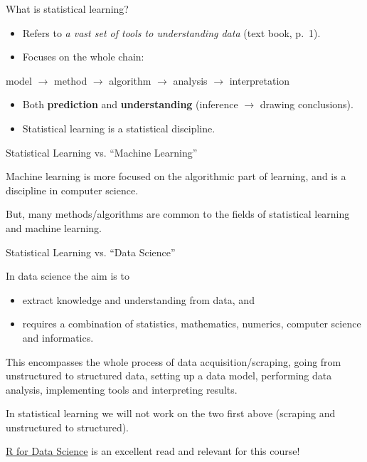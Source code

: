 \documentclass[ignorenonframetext,]{beamer}
\providecommand{\tightlist}{%
  \setlength{\itemsep}{0pt}\setlength{\parskip}{0pt}}
\begin{document}
\begin{frame}{What is statistical learning?}

\begin{itemize}
\item
  Refers to \emph{a vast set of tools to understanding data} (text book,
  p.~1).
\item
  Focuses on the whole chain:
\end{itemize}

model \(\rightarrow\) method \(\rightarrow\) algorithm \(\rightarrow\)
analysis \(\rightarrow\) interpretation

\begin{itemize}
\item
  Both \textbf{prediction} and \textbf{understanding} (inference
  \(\rightarrow\) drawing conclusions).
\item
  Statistical learning is a statistical discipline.
\end{itemize}

\end{frame}

\begin{frame}{Statistical Learning vs. ``Machine Learning''}

Machine learning is more focused on the algorithmic part of learning,
and is a discipline in computer science.

But, many methods/algorithms are common to the fields of statistical
learning and machine learning.

\end{frame}

\begin{frame}{Statistical Learning vs. ``Data Science''}

In data science the aim is to

\begin{itemize}
\tightlist
\item
  extract knowledge and understanding from data, and
\item
  requires a combination of statistics, mathematics, numerics, computer
  science and informatics.
\end{itemize}

This encompasses the whole process of data acquisition/scraping, going
from unstructured to structured data, setting up a data model,
performing data analysis, implementing tools and interpreting results.

In statistical learning we will not work on the two first above
(scraping and unstructured to structured).

\href{http://r4ds.had.co.nz/}{R for Data Science} is an excellent read
and relevant for this course!

\end{frame}
\end{document}
